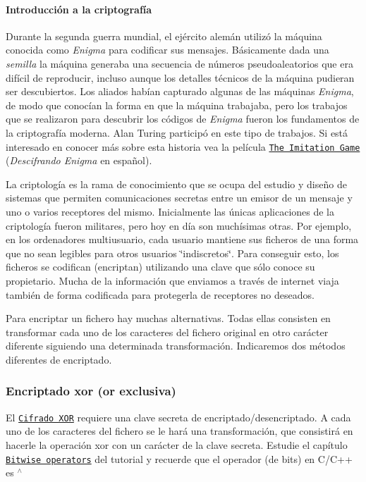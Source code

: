 \paragraph*{Introducción a la criptografía}

Durante la segunda guerra mundial, el ejército alemán utilizó la máquina conocida como {\itshape Enigma} para codificar sus mensajes. Básicamente dada una {\itshape semilla} la máquina generaba una secuencia de números pseudoaleatorios que era difícil de reproducir, incluso aunque los detalles técnicos de la máquina pudieran ser descubiertos. Los aliados habían capturado algunas de las máquinas {\itshape Enigma}, de modo que conocían la forma en que la máquina trabajaba, pero los trabajos que se realizaron para descubrir los códigos de {\itshape Enigma} fueron los fundamentos de la criptografía moderna. Alan Turing participó en este tipo de trabajos. Si está interesado en conocer más sobre esta historia vea la película \href{https://en.wikipedia.org/wiki/The_Imitation_Game}{\tt The Imitation Game} ({\itshape Descifrando Enigma} en español).

La criptología es la rama de conocimiento que se ocupa del estudio y diseño de sistemas que permiten comunicaciones secretas entre un emisor de un mensaje y uno o varios receptores del mismo. Inicialmente las únicas aplicaciones de la criptología fueron militares, pero hoy en día son muchísimas otras. Por ejemplo, en los ordenadores multiusuario, cada usuario mantiene sus ficheros de una forma que no sean legibles para otros usuarios \char`\"{}indiscretos\char`\"{}. Para conseguir esto, los ficheros se codifican (encriptan) utilizando una clave que sólo conoce su propietario. Mucha de la información que enviamos a través de internet viaja también de forma codificada para protegerla de receptores no deseados.

Para encriptar un fichero hay muchas alternativas. Todas ellas consisten en transformar cada uno de los caracteres del fichero original en otro carácter diferente siguiendo una determinada transformación. Indicaremos dos métodos diferentes de encriptado.

\subsubsection*{Encriptado xor (or exclusiva)}

El \href{https://es.wikipedia.org/wiki/Cifrado_XOR}{\tt Cifrado X\+OR} requiere una clave secreta de encriptado/desencriptado. A cada uno de los caracteres del fichero se le hará una transformación, que consistirá en hacerle la operación {\ttfamily xor} con un carácter de la clave secreta. Estudie el capítulo \href{https://www.learncpp.com/cpp-tutorial/bitwise-operators/}{\tt Bitwise operators} del tutorial y recuerde que el operador (de bits) en C/\+C++ es {\ttfamily $^\wedge$}

